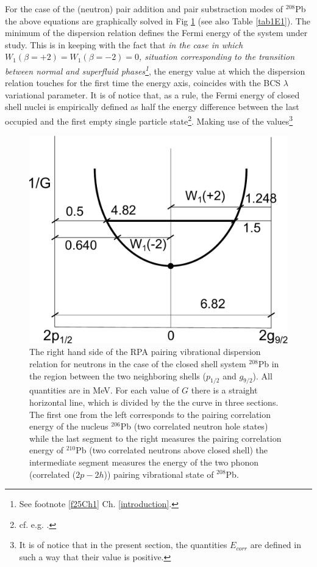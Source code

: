 For the case of the (neutron) pair addition and pair substraction modes of $^{208}$Pb the above equations are  graphically solved in Fig \ref{fig1E1} (see also Table \ref{tab1E1}). The minimum of the dispersion relation defines the Fermi energy of the system under study. This is in keeping with the fact that \textit{in the case in which $W_1 (\beta=+2)=W_1(\beta=-2)=0$, situation corresponding to the  transition between normal and superfluid phases\footnote{See footnote \ref{f25Ch1} Ch. \ref{introduction}.}}, the energy value at which the dispersion relation touches for the first time the energy axis, coincides with the BCS $\lambda$ variational parameter. It is of notice that, as a rule, the Fermi energy of closed shell nuclei is empirically defined as half the energy difference between the last occupied and the first empty single particle state\footnote{cf. e.g. \cite{Mahaux:85}.}. Making use of the values\footnote{\label{f50C3} It is of notice that in the present section, the quantities $E_{corr}$ are defined in such a way that their value is positive.} 
  \begin{figure}
  \centerline{\includegraphics*[width=\textwidth,angle=0]{nutshell/figs/dispersion.pdf}}
  \caption[Dispersion relation for $^{208}$Pb.]{The right hand side of the RPA pairing vibrational dispersion relation for neutrons in the case of the closed shell system $^{208}$Pb in the region between the two neighboring shells ($p_{1/2}$ and $g_{9/2}$). All quantities are in MeV. For each value of $G$ there is a straight horizontal line, which is divided by the the curve in three sections. The first one from the left corresponds to the pairing correlation energy of the nucleus $^{206}$Pb (two correlated neutron hole states) while the last segment to the right measures the pairing correlation energy of $^{210}$Pb (two correlated neutrons above closed shell) the intermediate segment measures the energy of the two phonon (correlated ($2p-2h$)) pairing vibrational state  of $^{208}$Pb.}\label{fig1E1}
  \end{figure}
